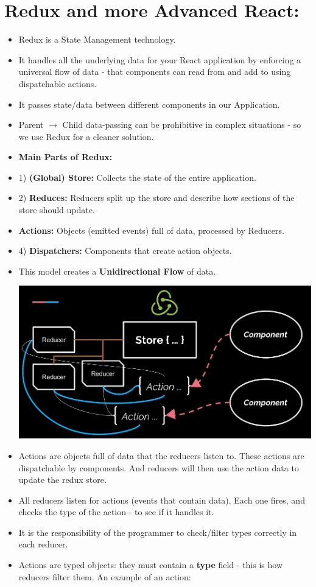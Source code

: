 \documentclass[8pt,a4paper]{extarticle}
\begin{document}
\section{Redux and more Advanced React:}

\begin{itemize}
\item Redux is a State Management technology.
\item It handles all the underlying data for your React application by enforcing a universal flow of data - that components can read from and add to using dispatchable actions.
\item It passes state/data between different components in our Application. 
\item Parent $\rightarrow$ Child data-passing can be prohibitive in complex situations - so we use Redux for a cleaner solution.
\item \textbf{Main Parts of Redux:}
\item 1) \textbf{(Global) Store:} Collects the state of the entire application.
\item 2) \textbf{Reduces:} Reducers split up the store and describe how sections of the store should update.
\item \textbf{Actions:} Objects (emitted events) full of data, processed by Reducers.
\item 4) \textbf{Dispatchers:} Components that create action objects.
\item This model creates a \textbf{Unidirectional Flow} of data.

\includegraphics[scale=0.25]{redux_chart.png}

\item Actions are objects full of data that the reducers listen to. These actions are dispatchable by components. And reducers will then use the action data to update the redux store.
\item All reducers listen for actions (events that contain data). Each one fires, and checks the type of the action - to see if it handles it.
\item It is the responsibility of the programmer to check/filter types correctly in each reducer.
\item Actions are typed objects: they must contain a \textbf{type} field - this is how reducers filter them. An example of an action:


\end{itemize}
\end{document}
